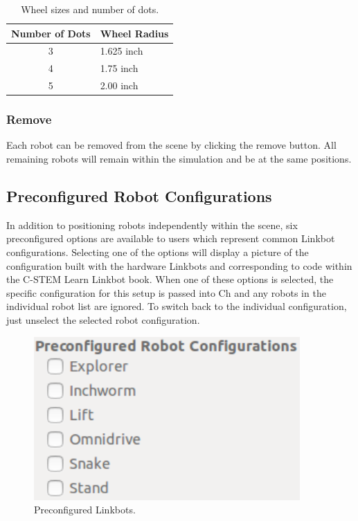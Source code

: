 \documentclass{article}
\begin{document}
\begin{table}[H]
	\begin{center}
	\begin{tabular}{c | l }
		\hline \hline
		\textbf{Number of Dots} & \textbf{Wheel Radius} \\ \hline
		3 & 1.625 inch \\
		4 & 1.75 inch \\
		5 & 2.00 inch \\
		\hline \hline
	\end{tabular}
	\caption{Wheel sizes and number of dots.}
	\label{tab:wheels}
	\end{center}
\end{table}

\subsubsection{Remove}
Each robot can be removed from the scene by clicking the remove button.  All
remaining robots will remain within the simulation and be at the same positions.

\subsection{Preconfigured Robot Configurations}
In addition to positioning robots independently within the scene, six 
preconfigured options are available to users which represent common Linkbot
configurations.  Selecting one of the options will display a picture of the
configuration built with the hardware Linkbots and corresponding to code within
the C-STEM Learn Linkbot book.  When one of these options is selected, the
specific configuration for this setup is passed into Ch and any robots in the
individual robot list are ignored.  To switch back to the individual
configuration, just unselect the selected robot configuration.
\begin{figure}[H]
	\begin{center}
		\includegraphics[width=4in]{images/preconfig}
	\end{center}
	\caption{Preconfigured Linkbots.}
	\label{fig:preconfig}
\end{figure}
\end{document}
